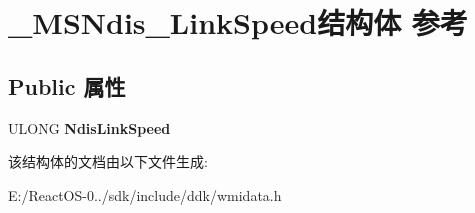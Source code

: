 \hypertarget{struct___m_s_ndis___link_speed}{}\section{\+\_\+\+M\+S\+Ndis\+\_\+\+Link\+Speed结构体 参考}
\label{struct___m_s_ndis___link_speed}
\subsection*{Public 属性}
\begin{DoxyCompactItemize}
\item 
\mbox{\label{struct___m_s_ndis___link_speed_aa0ae3b820de3a270b70920838fdf7fd0}} 
U\+L\+O\+NG {\bfseries Ndis\+Link\+Speed}
\end{DoxyCompactItemize}


该结构体的文档由以下文件生成\+:\begin{DoxyCompactItemize}
\item 
E\+:/\+React\+O\+S-\/0../sdk/include/ddk/wmidata.\+h\end{DoxyCompactItemize}
